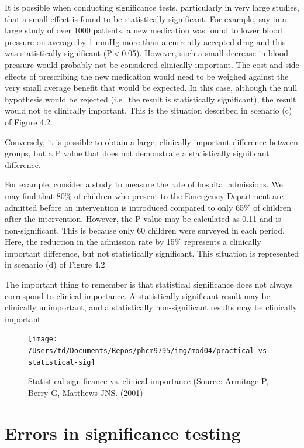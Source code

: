 \documentclass[
]{memoir}
\begin{document}
It is possible when conducting significance tests, particularly in very large studies, that a small effect is found to be statistically significant. For example, say in a large study of over 1000 patients, a new medication was found to lower blood pressure on average by 1 mmHg more than a currently accepted drug and this was statistically significant (P \textless{} 0.05). However, such a small decrease in blood pressure would probably not be considered clinically important. The cost and side effects of prescribing the new medication would need to be weighed against the very small average benefit that would be expected. In this case, although the null hypothesis would be rejected (i.e.~the result is statistically significant), the result would not be clinically important. This is the situation described in scenario (c) of Figure 4.2.

Conversely, it is possible to obtain a large, clinically important difference between groups, but a P value that does not demonstrate a statistically significant difference.

For example, consider a study to measure the rate of hospital admissions. We may find that 80\% of children who present to the Emergency Department are admitted before an intervention is introduced compared to only 65\% of children after the intervention. However, the P value may be calculated as 0.11 and is non-significant. This is because only 60 children were surveyed in each period. Here, the reduction in the admission rate by 15\% represents a clinically important difference, but not statistically significant. This situation is represented in scenario (d) of Figure 4.2

The important thing to remember is that statistical significance does not always correspond to clinical importance. A statistically significant result may be clinically unimportant, and a statistically non-significant results may be clinically important.

\begin{figure}
\texttt{[image: /Users/td/Documents/Repos/phcm9795/img/mod04/practical-vs-statistical-sig]} \caption{Statistical significance vs. clinical importance (Source: Armitage P, Berry G, Matthews JNS. (2001)}\label{fig:practical-importance}
\end{figure}

\hypertarget{errors-in-significance-testing}{%
\section{Errors in significance testing}\label{errors-in-significance-testing}}
\end{document}
